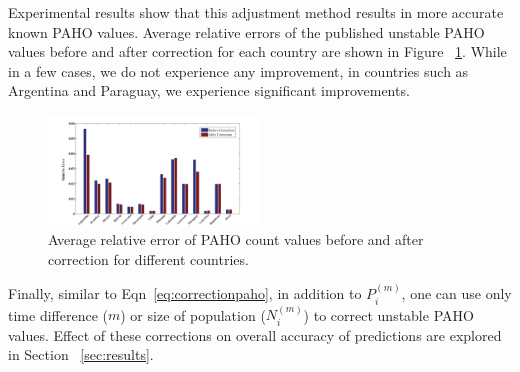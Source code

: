 Experimental results show that this adjustment method results in more accurate
known PAHO values. Average relative errors of the published unstable PAHO
values before and after correction for each
country are shown in Figure ~\ref{fig:avgrelerrors}. While in a few cases,
we do not experience any improvement, in countries such as Argentina and Paraguay,
we experience significant improvements.


\begin{figure}[h]
  \captionsetup{font=scriptsize}
  \centering
    \includegraphics[width=0.5\textwidth]{fig/errs}
  \caption{Average relative error of PAHO count values before and after 
  correction for different countries.}
  \label{fig:avgrelerrors}
\vspace{-1em}
\end{figure}

Finally, similar to Eqn~\ref{eq:correctionpaho}, in addition to $P_i^{(m)}$, one can
use only time difference ($m$) or size of population ($N_i^{(m)}$) to correct
unstable PAHO values. Effect of these corrections on overall accuracy of
predictions are explored in Section ~\ref{sec:results}.

